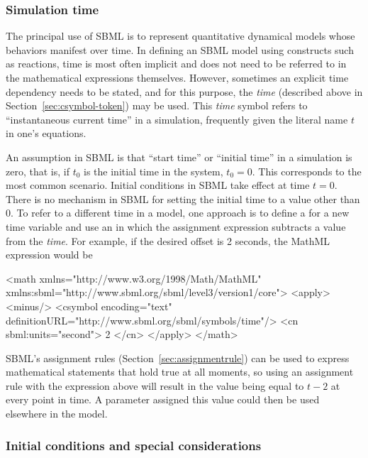 \subsubsection{Simulation time}
\label{sec:meaning-of-time}

The principal use of SBML is to represent quantitative dynamical
models whose behaviors manifest over time.  In defining an
SBML model using constructs such as reactions, time is most often
implicit and does not need to be referred to in the mathematical
expressions themselves.  However, sometimes an explicit time
dependency needs to be stated, and for this purpose, the
\emph{time}  (described above in
Section~\ref{sec:csymbol-token}) may be used.  This \emph{time}
symbol refers to ``instantaneous current time'' in a simulation,
frequently given the literal name $t$ in one's equations.

An assumption in SBML is that ``start time'' or ``initial time''
in a simulation is zero, that is, if $t_0$ is the initial time in
the system, $t_0 = 0$.  This corresponds to the most common
scenario.  Initial conditions in SBML take effect at time $t = 0$.
There is no mechanism in SBML for setting the initial time to a
value other than 0.  To refer to a different time in a model, one
approach is to define a \Parameter for a new time variable and use
an \AssignmentRule in which the assignment expression subtracts a
value from the  \emph{time}.  For example, if the
desired offset is 2 seconds, the MathML expression would be

\begin{example}
<math xmlns="http://www.w3.org/1998/Math/MathML"
      xmlns:sbml="http://www.sbml.org/sbml/level3/version1/core">
    <apply>
        <minus/>
        <csymbol encoding="text" definitionURL="http://www.sbml.org/sbml/symbols/time"/> 
        <cn sbml:units="second"> 2 </cn>
    </apply>
</math>
\end{example}

SBML's assignment rules (Section~\ref{sec:assignmentrule}) can be
used to express mathematical statements that hold true at all
moments, so using an assignment rule with the expression above
will result in the value being equal to $t - 2$ at every point in
time.  A parameter assigned this value could then be used
elsewhere in the model.


\subsubsection{Initial conditions and special considerations}
\label{sec:before-t0}

